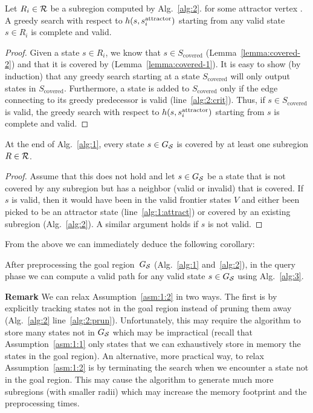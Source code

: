 \documentclass[a4paper]{report}
\begin{document}
\begin{lemma}
\label{lemma:greedy}
Let $R_i \in \mathcal{R}$ be a subregion computed by Alg.~\ref{alg:2}.
for some attractor vertex \sAttract.
% 
A greedy search with respect to $h(s, s^{\text{attractor}}_i)$  starting from any valid state $s \in R_i$ is complete and valid.
\end{lemma}

\begin{proof}
Given a state $s \in R_i$, we know that $s \in S_{\text{covered}}$ (Lemma~\ref{lemma:covered-2})
and that it is covered by \sAttract (Lemma~\ref{lemma:covered-1}).
%
It is easy to show (by induction) that any greedy search starting at a state $S_{\text{covered}}$ will only output states in $S_{\text{covered}}$.
Furthermore, a state is added to $S_{\text{covered}}$ only if the edge connecting to its greedy predecessor is valid (line~\ref{alg:2:crit}).
Thus, if $s\in S_{\text{covered}}$ is valid, the greedy search with respect to $h(s, s^{\text{attractor}}_i)$  starting from $s$ is complete and valid.
\end{proof}

\begin{lemma}
\label{lemma:coverage}
At the end of Alg.~\ref{alg:1}, every state $s \in G_\mathcal{S}$ is covered by at least one subregion $R \in \mathcal{R}$.
\end{lemma}
\begin{proof}
Assume that this does not hold and let $s \in G_\mathcal{S}$ be a state that is not covered by any subregion but has a neighbor (valid or invalid) that is covered.
%
If $s$ is valid, then it would have been in the valid frontier states $V$ and either been picked to be an attractor state (line~\ref{alg:1:attract}) or covered by an existing subregion (Alg.~\ref{alg:2}).
%
A similar argument holds if $s$ is not valid.
\end{proof}

From the above we can immediately deduce the following corollary:

\vspace{2mm}

\begin{cor}
  After preprocessing the goal region~$G_\mathcal{S}$ (Alg.~\ref{alg:1} and~\ref{alg:2}), in the query phase we can compute a valid path for any valid state $s \in G_\mathcal{S}$ using Alg.~\ref{alg:3}.
\end{cor}


\textbf{Remark}
We can relax Assumption~\ref{asm:1:2} in two ways.
The first is by explicitly tracking states not in the goal region instead of pruning them away (Alg.~\ref{alg:2} line~\ref{alg:2:prun}).
Unfortunately, this may require the algorithm to store many states not in $G_\mathcal{S}$  which may be impractical (recall that Assumption~\ref{asm:1:1} only states that we can exhaustively store in memory the states in the goal region).
An alternative, more practical way, to relax Assumption~\ref{asm:1:2}  is by terminating the search when we  encounter a state not in the goal region.
This may cause the algorithm to generate much more subregions (with smaller radii) which may increase the memory footprint and the preprocessing times.
\end{document}
